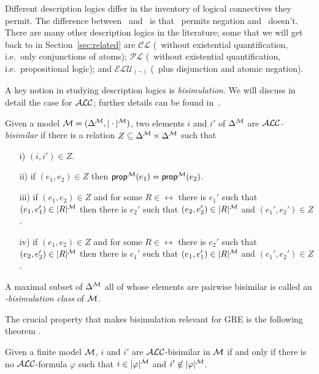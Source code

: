 Different description logics differ in the inventory of logical
connectives they permit.  The difference between \alc\ and \el\ is
that \alc\ permits negation and \el\ doesn't.  There are many other
description logics in the literature; some that we will get back to in
Section~\ref{sec:related} are $\mathcal{CL}$ (\el\ without existential
quantification, i.e.\ only conjunctions of atoms); $\mathcal{PL}$
(\alc\ without existential quantification, i.e.\ propositional logic);
and $\mathcal{ELU}_{(\neg)}$ (\el\ plus disjunction and atomic
negation).

A key notion in studying description logics is \emph{bisimulation}.
We will discuss in detail the case for $\mathcal{ALC}$; further details can be
found in~\cite{blac:moda01,kurt:expr99}.

\begin{definition}
Given a model $\mathcal{M} = (\Delta^{\mathcal{M}},|\cdot|^{\mathcal{M}})$, two elements $i$ and
$i'$ of $\Delta^{\mathcal{M}}$ are \emph{$\mathcal{ALC}$-bisimilar} if there is a relation $Z
\subseteq \Delta^{\mathcal{M}} \times \Delta^{\mathcal{M}}$ such that 
\begin{itemize}
\item[i)] $(i,i') \in Z$.\\[-1.5em]
\item[ii)] if $(e_1, e_2) \in Z$ then $\textsf{prop}^{\mathcal{M}}(e_1) = \textsf{prop}^{\mathcal{M}}(e_2)$.\\[-1.5em]
\item[iii)] if $(e_1,e_2) \in Z$ and for some $R \in \rel$ there is $e_1'$ such that
$(e_1,e_1') \in |R|^{\mathcal{M}}$ then there is $e_2'$ such that $(e_2,e_2') \in |R|^{\mathcal{M}}$ and
$(e_1',e_2') \in Z$.\\[-1.5em]
\item[iv)] if $(e_1,e_2) \in Z$ and for some $R \in \rel$ there is $e_2'$ such that
$(e_2,e_2') \in |R|^{\mathcal{M}}$ then there is $e_1'$ such that $(e_1,e_1') \in |R|^{\mathcal{M}}$ and
$(e_1',e_2') \in Z$.
\end{itemize}
A maximal subset of $\Delta^{\mathcal{M}}$ all of whose elements are pairwise
bisimilar is called an \emph{\alc-bisimulation class} of $\mathcal{M}$.
\end{definition}

The crucial property that makes bisimulation relevant for GRE is the
following theorem \cite{blac:moda01}.

\begin{theorem}\label{bisim}
  Given a finite model $\mathcal{M}$, $i$ and $i'$ are $\mathcal{ALC}$-bisimilar in
  $\mathcal{M}$ if and only if there is no $\mathcal{ALC}$-formula $\varphi$ such that
  $i \in |\varphi|^{\mathcal{M}}$ and $i' \not \in |\varphi|^{\mathcal{M}}$.
\end{theorem}

